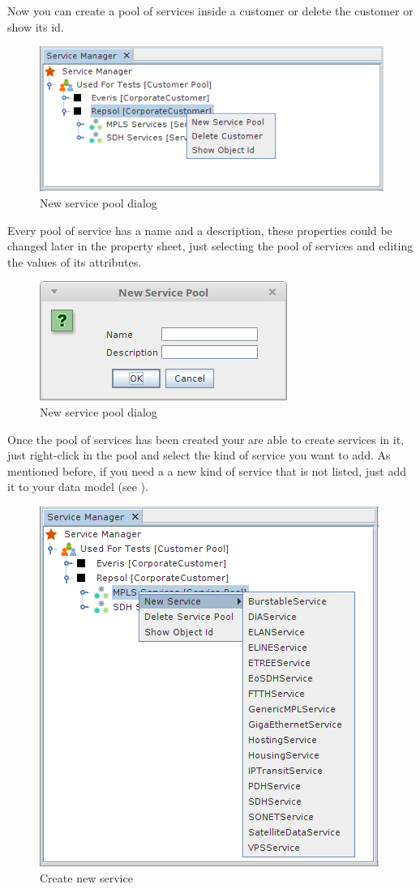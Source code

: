 \documentclass[a4paper]{article}
\begin{document}
    Now you can create a pool of services inside a customer or delete the customer or show its id. 
	\begin{figure}[h!]
		\centering
		\includegraphics[width=0.6\linewidth]{img/sm_customer_actions.png}
		\caption{New service pool dialog}
		\label{fig:sm_customer_actions}
	\end{figure}	

	Every pool of service has a name and a description, these properties could be changed later in the property sheet, just selecting the pool of services and editing the values of its attributes.
	\begin{figure}[h!]
		\centering
		\includegraphics[width=0.4\linewidth]{img/sm_new_service_pool.png}
		\caption{New service pool dialog}
		\label{fig:sm_new_service_pool}
	\end{figure}

	\newpage
	Once the pool of services has been created your are able to create services in it, just right-click in the pool and select the kind of service you want to add. As mentioned before, if you need a a new kind of service that is not listed, just add it to your data model (see \textbf{}). 
	\begin{figure}[h!]
		\centering
		\includegraphics[width=0.6\linewidth]{img/sm_create_new_service.png}
		\caption{Create new service}
		\label{fig:sm_create_new_service}
	\end{figure}
	
\end{document}
